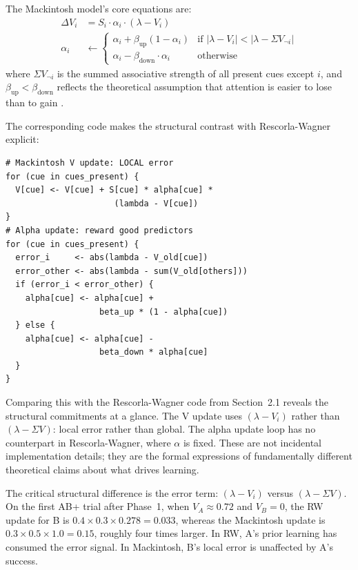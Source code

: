 \documentclass[fleqn,10pt]{wlscirep}
\begin{document}
\begin{linenumbers}
The Mackintosh model's core equations are:
\begin{align}
\Delta V_i &= S_i \cdot \alpha_i \cdot (\lambda - V_i) \label{eq:mack} \\
\alpha_i &\leftarrow
\begin{cases}
\alpha_i + \beta_{\text{up}} (1 - \alpha_i) & \text{if } |\lambda - V_i| < |\lambda - \Sigma V_{\neg i}| \\
\alpha_i - \beta_{\text{down}} \cdot \alpha_i & \text{otherwise}
\end{cases} \label{eq:mack_alpha}
\end{align}
where $\Sigma V_{\neg i}$ is the summed associative strength of all present cues except $i$, and $\beta_{\text{up}} < \beta_{\text{down}}$ reflects the theoretical assumption that attention is easier to lose than to gain \citep{lepelley2004role}.

The corresponding code makes the structural contrast with Rescorla-Wagner explicit:
\begin{verbatim}
# Mackintosh V update: LOCAL error
for (cue in cues_present) {
  V[cue] <- V[cue] + S[cue] * alpha[cue] *
                      (lambda - V[cue])
}
# Alpha update: reward good predictors
for (cue in cues_present) {
  error_i     <- abs(lambda - V_old[cue])
  error_other <- abs(lambda - sum(V_old[others]))
  if (error_i < error_other) {
    alpha[cue] <- alpha[cue] +
                   beta_up * (1 - alpha[cue])
  } else {
    alpha[cue] <- alpha[cue] -
                   beta_down * alpha[cue]
  }
}
\end{verbatim}
Comparing this with the Rescorla-Wagner code from Section~2.1 reveals the structural commitments at a glance. The V update uses $(\lambda - V_i)$ rather than $(\lambda - \Sigma V)$: local error rather than global. The alpha update loop has no counterpart in Rescorla-Wagner, where $\alpha$ is fixed. These are not incidental implementation details; they are the formal expressions of fundamentally different theoretical claims about what drives learning.

The critical structural difference is the error term: $(\lambda - V_i)$ versus $(\lambda - \Sigma V)$. On the first AB+ trial after Phase~1, when $V_A \approx 0.72$ and $V_B = 0$, the RW update for B is $0.4 \times 0.3 \times 0.278 = 0.033$, whereas the Mackintosh update is $0.3 \times 0.5 \times 1.0 = 0.15$, roughly four times larger. In RW, A's prior learning has consumed the error signal. In Mackintosh, B's local error is unaffected by A's success.


\end{linenumbers}
\end{document}
